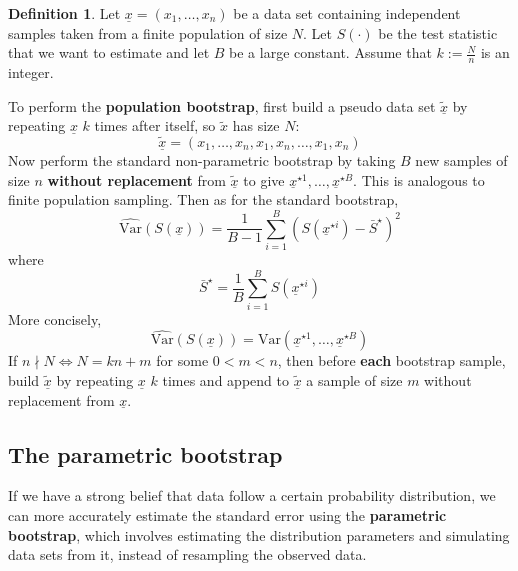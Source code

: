 \documentclass[12pt,a4paper]{article}
\theoremstyle{definition}
\newtheorem{definition}{Definition}[subsection]
\begin{document}
\begin{definition}
	Let $\underline{x} = (x_1, \dots, x_n)$ be a data set containing independent samples taken from a finite population of size $N$. Let $S(\cdot)$ be the test statistic that we want to estimate and let $B$ be a large constant. Assume that $k := \frac{N}{n}$ is an integer.

	To perform the \textbf{population bootstrap}, first build a pseudo data set $\tilde{\underline{x}}$ by repeating $\underline{x}$ $k$ times after itself, so $\tilde{x}$ has size $N$:
	\[
		\tilde{\underline{x}} = (x_1, \dots, x_n, x_1, x_n, \dots, x_1, x_n)
	\]
	Now perform the standard non-parametric bootstrap by taking $B$ new samples of size $n$ \textbf{without replacement} from $\tilde{\underline{x}}$ to give $\underline{x}^{\star 1}, \dots, \underline{x}^{\star B}$. This is analogous to finite population sampling. Then as for the standard bootstrap,
	\[
		\widehat{\text{Var}}(S(\underline{x})) = \frac{1}{B - 1} \sum_{i = 1}^B {\left( S \left( \underline{x}^{\star i} \right) - \bar{S}^{\star} \right)}^2
	\]
	where
	\[
		\bar{S}^{\star} = \frac{1}{B} \sum_{i = 1}^B S \left( \underline{x}^{\star i} \right)
	\]
	More concisely,
	\[
		\widehat{\text{Var}}(S(\underline{x})) = \text{Var} \left( \underline{x}^{\star 1}, \dots, \underline{x}^{\star B} \right)
	\]
	If $n \nmid N \Longleftrightarrow N = kn + m$ for some $0 < m < n$, then before \textbf{each} bootstrap sample, build $\tilde{\underline{x}}$ by repeating $\underline{x}$ $k$ times and append to $\tilde{\underline{x}}$ a sample of size $m$ without replacement from $\underline{x}$.
\end{definition}

\subsection{The parametric bootstrap}

If we have a strong belief that data follow a certain probability distribution, we can more accurately estimate the standard error using the \textbf{parametric bootstrap}, which involves estimating the distribution parameters and simulating data sets from it, instead of resampling the observed data.
\end{document}
